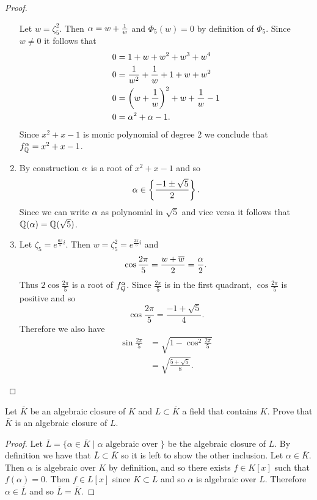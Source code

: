 \begin{proof}
\begin{enumerate}
            Let $w=\zeta_5^2$. Then $\alpha=w+\frac1w$ and $\Phi_5(w)=0$ by definition of $\Phi_5$. Since $w\neq0$ it follows that
            \begin{align*}
                0&=1+w+w^2+w^3+w^4\\
                0&=\frac{1}{w^2}+\frac1w+1+w+w^2\\
                0&=\left(w+\frac1w\right)^2+w+\dfrac1w-1\\
                0&=\alpha^2+\alpha-1.
            \end{align*}
            Since $x^2+x-1$ is monic polynomial of degree 2 we conclude that $f^\alpha_{\mathbb{Q}}=x^2+x-1$.
        \item By construction $\alpha$ is a root of $x^2+x-1$ and so
            $$\alpha\in\left\{\frac{-1\pm\sqrt{5}}{2}\right\}.$$
            Since we can write $\alpha$ as polynomial in $\sqrt{5}$ and vice versa it follows that $\mathbb{Q}(\alpha)=\mathbb{Q}(\sqrt{5})$.
        \item Let $\zeta_5=e^{\frac{6\pi}{5}i}$. Then $w=\zeta_5^2=e^{\frac{2\pi}{5}i}$ and 
            $$\cos\frac{2\pi}{5}=\frac{w+\overline{w}}{2}=\frac{\alpha}{2}.$$
            Thus $2\cos\frac{2\pi}{5}$ is a root of $f^\alpha_Q$. Since $\frac{2\pi}{5}$ is in the first quadrant, $\cos\frac{2\pi}{5}$ is positive and so
            $$\cos\frac{2\pi}{5}=\frac{-1+\sqrt{5}}{4}.$$
            Therefore we also have
            \begin{align*}
                \sin\frac{2\pi}{5}&=\sqrt{1-\cos^2\frac{2\pi}{5}}\\
                &=\sqrt{\frac{5+\sqrt{5}}{8}}.
            \end{align*}
        \end{enumerate}
    \end{proof}

    \begin{ex}{21.31}
        Let $\overline{K}$ be an algebraic closure of $K$ and $L\subset\overline{K}$ a field that contains $K$. Prove that $\overline{K}$ is an algebraic closure of $L$.
    \end{ex}
    \begin{proof}
        Let $\overline{L}=\{\alpha\in\overline{K}\mid \alpha\text{ algebraic over }\}$ be the algebraic closure of $L$.
        By definition we have that $\overline{L}\subset\overline{K}$ so it is left to show the other inclusion. Let $\alpha\in\overline{K}$.
        Then $\alpha$ is algebraic over $K$ by definition, and so there exists $f\in K[x]$ such that $f(\alpha)=0$. Then $f\in L[x]$ since $K\subset L$ and so $\alpha$ is algebraic over $L$.
        Therefore $\alpha\in\overline{L}$ and so $\overline{L}=\overline{K}$.
    \end{proof}

